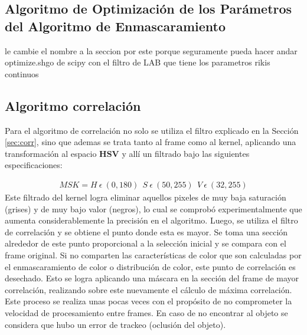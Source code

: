 \subsection{Algoritmo de Optimización de los Parámetros del Algoritmo de Enmascaramiento}
\large{le cambie el nombre a la seccion por este porque seguramente pueda hacer andar optimize.shgo de scipy con el filtro de LAB que tiene los parametros rikis continuos}
\subsection{Algoritmo correlación}
Para el algoritmo de correlación no solo se utiliza el filtro explicado en la Sección \ref{sec:corr}, sino que ademas se trata tanto al frame como al kernel, aplicando una transformación al espacio \textbf{HSV} y allí un filtrado bajo las siguientes especificaciones: 
            
\begin{align}
MSK = H \  \epsilon \ (0,180 ) \ \ S \  \epsilon \ (50,255) \ \ V \ \epsilon \ (32,255)
\end{align}
Este filtrado del kernel logra eliminar aquellos pixeles de muy baja saturación (grises) y de muy bajo valor (negros), lo cual se comprobó experimentalmente que aumenta considerablemente la precisión en el algoritmo.
Luego, se utiliza el filtro de correlación y se obtiene el punto donde esta es mayor. Se toma una sección alrededor de este punto proporcional a la selección inicial y se compara con el frame original. Si no comparten las características de color que son calculadas por el enmascaramiento de color o distribución de color, este punto de correlación es desechado. Esto se logra aplicando una máscara en la sección del frame de mayor correlación, realizando sobre este nuevamente el cálculo de máxima correlación. Este proceso se realiza unas pocas veces con el propósito de no comprometer la velocidad de procesamiento entre frames. En caso de no encontrar al objeto se considera que hubo un error de trackeo (oclusión del objeto).\\

